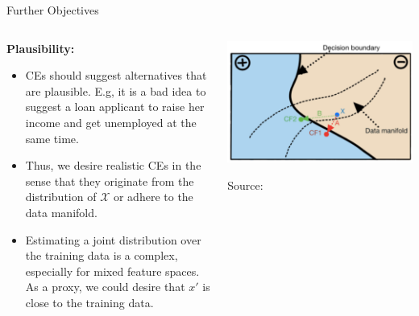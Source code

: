 \documentclass[aspectratio=169]{../latex_main/tntbeamer}  %
\begin{document}
\begin{frame}[c]{Further Objectives }
	
	\begin{columns}
	\begin{column}{0.55\textwidth}
		\textbf{Plausibility:}
		\begin{itemize}
			\item CEs should suggest alternatives that are plausible. E.g, it is a bad idea to suggest a loan applicant to raise her income and get unemployed at the same time. 
			\item Thus, we desire realistic CEs in the sense that they originate from the distribution of $\mathcal{X}$ or adhere to the data manifold. 
			\item Estimating a joint distribution over the training data is a complex, especially for mixed feature spaces. As a proxy, we could \alert{desire that $x'$ is close to the training data.}
		\end{itemize}	
	\end{column}
	\begin{column}{0.4\textwidth}
	
		\begin{center}
			\includegraphics[width=1\textwidth]{figure/counterfactuals_obj}
		\end{center}
		
	    Source: 
		
		\vspace{0.3cm}
	\end{column}
	\end{columns}

\end{frame}
\end{document}
